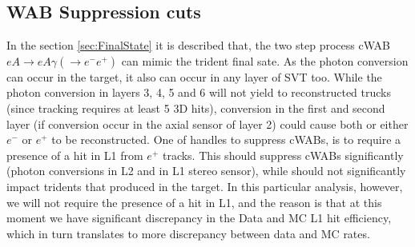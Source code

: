 \documentclass[letterpaper,12pt]{article}
\def \rarr {\rightarrow}
\begin{document}
\clearpage
\subsection{WAB Suppression cuts}
In the section \ref{sec:FinalState} it is described that, the two step process cWAB $eA\rarr eA\gamma(\rarr e^{-}e^{+})$ can mimic the trident final sate. As the photon conversion can occur in the target, it also can occur in any layer of SVT too. While the photon conversion in layers 3, 4, 5 and 6 will not yield to reconstructed trucks (since tracking requires at least 5 3D hits), conversion in the first and second layer (if conversion occur in the axial sensor of layer 2) could cause both or either $e^{-}$ or $e^{+}$ to be reconstructed. One of handles to suppress cWABs, is to require a presence of a hit in L1 from $e^{+}$ tracks. This should suppress cWABs significantly (photon conversions in L2 and in L1 stereo sensor), while should not significantly impact tridents that produced in the target. In this particular analysis, however, we will not require the presence of a hit in L1, and the reason is that at this moment we have significant discrepancy in the Data and MC L1 hit efficiency, which in turn translates to more discrepancy between data and MC rates.
\end{document}
